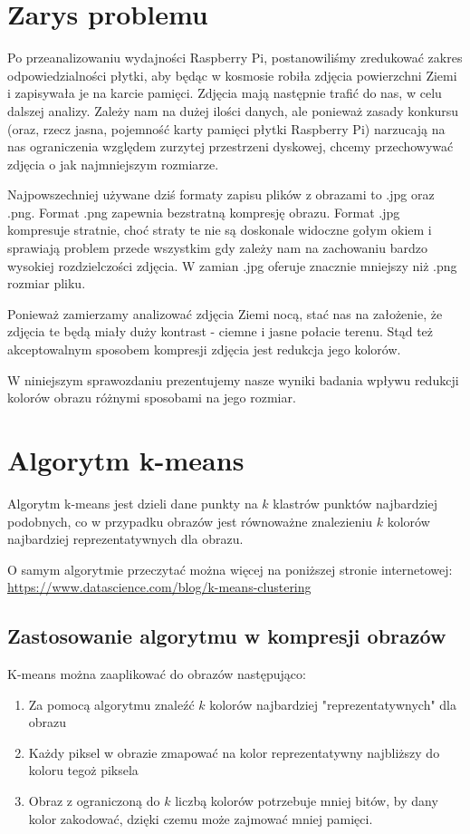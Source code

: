 \section{Zarys problemu}

Po przeanalizowaniu wydajności Raspberry Pi, postanowiliśmy zredukować zakres odpowiedzialności płytki, aby będąc w kosmosie robiła zdjęcia powierzchni Ziemi i zapisywała je na karcie pamięci.
Zdjęcia mają następnie trafić do nas, w celu dalszej analizy.
Zależy nam na dużej ilości danych, ale ponieważ zasady konkursu (oraz, rzecz jasna, pojemność karty pamięci płytki Raspberry Pi) narzucają na nas ograniczenia względem zurzytej przestrzeni dyskowej,
chcemy przechowywać zdjęcia o jak najmniejszym rozmiarze.

Najpowszechniej używane dziś formaty zapisu plików z obrazami to .jpg oraz .png. Format .png zapewnia bezstratną kompresję obrazu. Format .jpg kompresuje stratnie, choć straty te nie są doskonale widoczne gołym okiem i sprawiają problem przede wszystkim gdy zależy nam na zachowaniu bardzo wysokiej rozdzielczości zdjęcia. W zamian .jpg oferuje znacznie mniejszy niż .png rozmiar pliku.

Ponieważ zamierzamy analizować zdjęcia Ziemi nocą, stać nas na założenie, że zdjęcia te będą miały duży kontrast - ciemne i jasne połacie terenu. Stąd też akceptowalnym sposobem kompresji zdjęcia jest redukcja jego kolorów.

W niniejszym sprawozdaniu prezentujemy nasze wyniki badania wpływu redukcji kolorów obrazu różnymi sposobami na jego rozmiar.

\section{Algorytm k-means}

Algorytm k-means jest dzieli dane punkty na $k$ klastrów punktów najbardziej podobnych, co w przypadku obrazów jest równoważne
znalezieniu $k$ kolorów najbardziej reprezentatywnych dla obrazu.

O samym algorytmie przeczytać można więcej na poniższej stronie internetowej: \url{https://www.datascience.com/blog/k-means-clustering}

\subsection{Zastosowanie algorytmu w kompresji obrazów}
K-means można zaaplikować do obrazów następująco:

\begin{enumerate}
\item Za pomocą algorytmu znaleźć $k$ kolorów najbardziej "reprezentatywnych" dla obrazu
\item Każdy piksel w obrazie zmapować na kolor reprezentatywny najbliższy do koloru tegoż piksela
\item Obraz z ograniczoną do $k$ liczbą kolorów potrzebuje mniej bitów, by dany kolor zakodować, dzięki czemu może zajmować mniej pamięci.
\end{enumerate}

